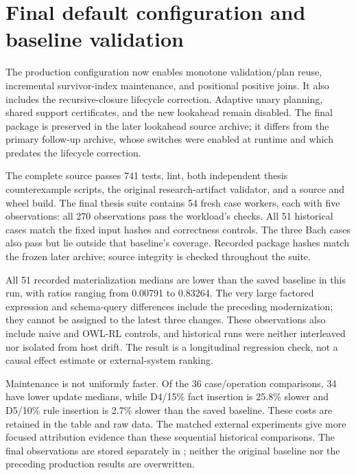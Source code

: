 \section{Final default configuration and baseline validation}
The production configuration now enables monotone validation/plan reuse,
incremental survivor-index maintenance, and positional positive joins. It also
includes the recursive-closure lifecycle correction. Adaptive unary planning,
shared support certificates, and the new lookahead remain disabled. The final
package is preserved in the later lookahead source archive; it differs from
the primary follow-up archive, whose switches were enabled at runtime and which
predates the lifecycle correction.

The complete source passes 741 tests, lint, both independent thesis
counterexample scripts, the original research-artifact validator, and a source
and wheel build. The final thesis suite contains 54 fresh case workers, each
with five observations: all 270 observations pass the workload's checks. All
51 historical cases match the fixed  input hashes and correctness
controls. The three Bach cases also pass but lie outside that baseline's
coverage. Recorded package hashes match the frozen later archive; source
integrity is checked throughout the suite.


All 51 recorded materialization medians are lower than the saved baseline in
this run, with ratios ranging from 0.00791 to 0.83264. The very large factored
expression and schema-query differences include the preceding modernization;
they cannot be assigned to the latest three changes. These observations also
include naive and OWL-RL controls, and historical runs were neither interleaved
nor isolated from host drift. The result is a longitudinal regression check,
not a causal effect estimate or external-system ranking.

Maintenance is not uniformly faster. Of the 36 case/operation comparisons,
34 have lower update medians, while D4/15\% fact insertion is 25.8\% slower
and D5/10\% rule insertion is 2.7\% slower than the saved baseline. These costs
are retained in the table and raw data. The matched external experiments give
more focused attribution evidence than these sequential historical comparisons.
The final observations are stored separately in
; neither the original baseline
nor the preceding production results are overwritten.
